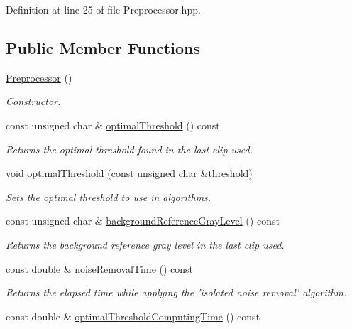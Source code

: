 Definition at line 25 of file Preprocessor.hpp.\subsection*{Public Member Functions}
\begin{CompactItemize}
\item 
\hyperlink{class_preprocessor_da966c8b83e7c3bcd8759549c3cdf688}{Preprocessor} ()
\begin{CompactList}\small\item\em Constructor. \item\end{CompactList}\item 
const unsigned char \& \hyperlink{class_preprocessor_a44dff024a5b29752780bd4aa0d53d81}{optimalThreshold} () const 
\begin{CompactList}\small\item\em Returns the optimal threshold found in the last clip used. \item\end{CompactList}\item 
void \hyperlink{class_preprocessor_1fc44d7d19944f3c3addd3a576c37414}{optimalThreshold} (const unsigned char \&threshold)
\begin{CompactList}\small\item\em Sets the optimal threshold to use in algorithms. \item\end{CompactList}\item 
const unsigned char \& \hyperlink{class_preprocessor_b435116619b7b254d9e788476c012e8a}{backgroundReferenceGrayLevel} () const 
\begin{CompactList}\small\item\em Returns the background reference gray level in the last clip used. \item\end{CompactList}\item 
const double \& \hyperlink{class_preprocessor_e54e2a5703a0f39ddff8e9936f9a2275}{noiseRemovalTime} () const 
\begin{CompactList}\small\item\em Returns the elapsed time while applying the 'isolated noise removal' algorithm. \item\end{CompactList}\item 
const double \& \hyperlink{class_preprocessor_2bd63a7e7aba300ddf79b2c956e943e9}{optimalThresholdComputingTime} () const 

\end{CompactItemize}
